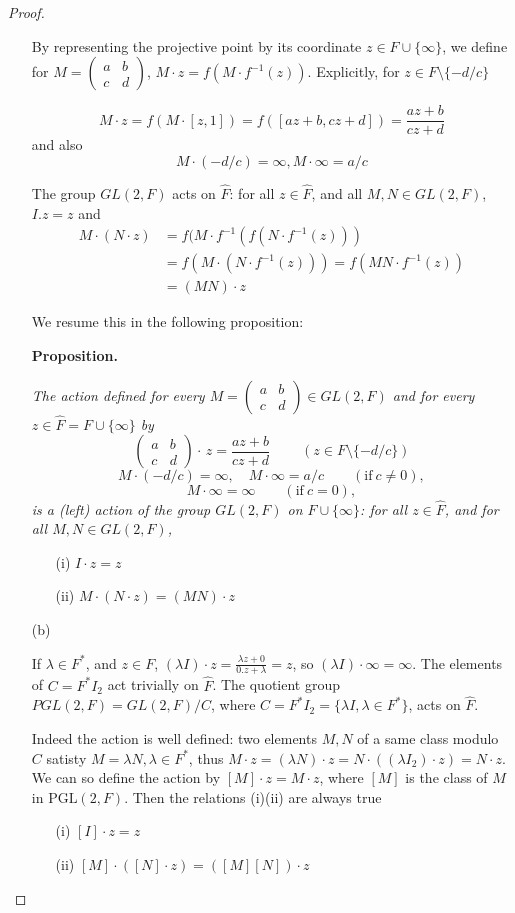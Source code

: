 \documentclass[11pt,a4paper]{article}
\newcommand{\be} {\begin{enumerate}}
\newcommand{\ee} {\end{enumerate}}
\begin{document}
\begin{proof}
\begin{enumerate}
By representing the projective point by its coordinate $z \in F \cup \{\infty\}$, we define for 
$M =
\left(
\begin{array}{cc}
 a&   b   \\
 c&   d   
\end{array}
\right)
$, 
 $M\cdot z = f(M\cdot f^{-1}(z))$. Explicitly, for $z \in F\setminus\{-d/c\}$

$$M\cdot z = f\left(M\cdot [z,1]\right)
=f([az+b,cz+d])=\frac{az+b}{cz+d}
$$
and also
$$M\cdot (-d/c) = \infty, M\cdot \infty = a/c$$

The group $GL(2,F)$ acts on $\hat{F} $: for all $z\in \hat{F }$, and all $ M,N \in GL(2,F)$,
$I.z=z$ and 
\begin{align*}
M\cdot (N\cdot z) &= f(M \cdot f^{-1}(f(N\cdot f^{-1}(z)))\\
&=f(M\cdot (N\cdot f^{-1}(z)))=f(MN \cdot f^{-1}(z))\\
&=(MN) \cdot z
\end{align*}

We resume this in the following proposition:

{\bf Proposition.}
{\it The action defined for every $M =
\left(
\begin{array}{cc}
 a&   b   \\
 c&   d   
\end{array}
\right)
 \in GL(2,F)$ and for every $z \in \hat{F} = F \cup \{\infty\} $ by
$$\left(
\begin{array}{cc}
 a&   b   \\
 c&   d   
\end{array}
\right)\cdot \, z = \frac{az+b}{cz+d}\ \qquad(z\in F\setminus\{-d/c\})
$$
$$M \cdot (-d/c) = \infty,\quad M \cdot \infty = a/c \qquad (\mathrm{if} \ c\neq 0),$$
$$M \cdot \infty = \infty \qquad (\mathrm{if}\ c=0),$$
is a (left) action of the group $GL(2,F)$ on $F \cup \{\infty\}$:
for all  $z\in \hat{F }$, and for all  $ M,N\in GL(2,F)$,
\be
\item[(i)] $I \cdot z=z$
\item[(ii)] $M\cdot (N \cdot z) = (MN) \cdot z$
\ee
}
\item[(b)]

If $\lambda \in F^*$, and $z \in F$, $(\lambda I) \cdot z = \frac{\lambda z +0}{0.z + \lambda} = z$, so $(\lambda I) \cdot \infty = \infty$. The elements of $C = F^* I_2$ act trivially on  $\hat{F}$.
The quotient group $PGL(2,F) = GL(2,F)/C$, where $C =F^* I_2 =  \{\lambda I, \lambda \in F^*\}$, acts on $\hat{F}$.

Indeed the action is well defined: two elements $M,N$ of a same class modulo $C$ satisty $M = \lambda N, \lambda \in F^*$, thus $M\cdot z = (\lambda N)\cdot z =N \cdot ((\lambda I_2) \cdot z) =  N \cdot z$. We can so define the action by $[M] \cdot z = M \cdot z$, where $[M]$ is the class of $M$ in $\mathrm{PGL}(2,F)$. Then the relations (i)(ii) are always true

\be
\item[(i)] $[I] \cdot z=z$
\item[(ii)] $[M]\cdot ([N] \cdot z) = ([M][N]) \cdot z$
\ee

\end{enumerate}
\end{proof}
\end{document}
